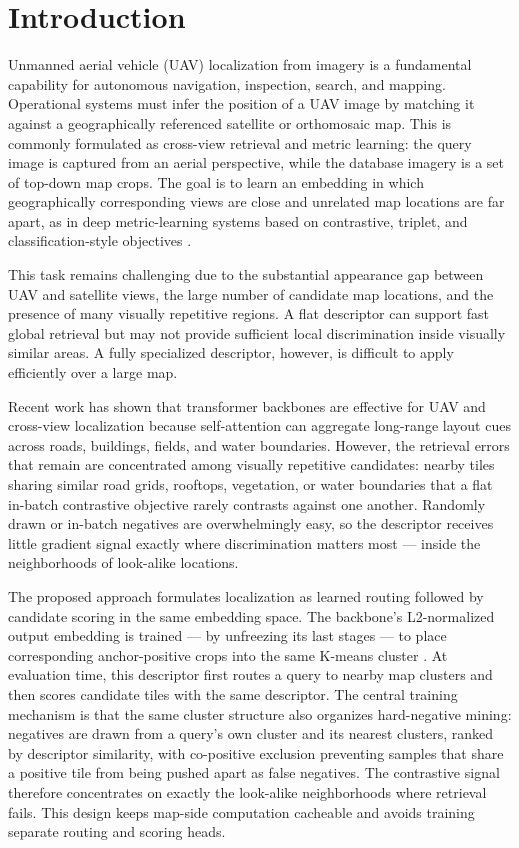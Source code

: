 \documentclass[conference]{IEEEtran}
\begin{document}
\section{Introduction}
Unmanned aerial vehicle (UAV) localization from imagery is a fundamental
capability for autonomous navigation, inspection, search, and mapping.
Operational systems must infer the position of a UAV image by matching it
against a geographically referenced satellite or orthomosaic map. This is
commonly formulated as cross-view retrieval and metric learning: the query image is
captured from an aerial perspective, while the database imagery is a set of
top-down map crops. The goal is to learn an embedding in which geographically
corresponding views are close and unrelated map locations are far apart, as in
deep metric-learning systems based on contrastive, triplet, and
classification-style objectives \cite{hadsell2006dimensionality,schroff2015facenet,sohn2016improved}.

This task remains challenging due to the substantial appearance gap between
UAV and satellite views, the large number of candidate map locations, and the
presence of many visually repetitive regions. A flat descriptor can support fast
global retrieval but may not provide sufficient local discrimination inside
visually similar areas. A fully specialized descriptor, however, is difficult
to apply efficiently over a large map.

Recent work has shown that transformer backbones are effective for UAV and
cross-view localization because self-attention can aggregate long-range layout
cues across roads, buildings, fields, and water boundaries. However, the
retrieval errors that remain are concentrated among visually repetitive
candidates: nearby tiles sharing similar road grids, rooftops, vegetation, or
water boundaries that a flat in-batch contrastive objective rarely contrasts
against one another. Randomly drawn or in-batch negatives are overwhelmingly
easy, so the descriptor receives little gradient signal exactly where
discrimination matters most — inside the neighborhoods of look-alike
locations.

The proposed approach formulates localization as learned routing followed by
candidate scoring in the same embedding space. The backbone's L2-normalized
output embedding is trained — by unfreezing its last stages — to place
corresponding anchor-positive crops into the
same K-means cluster \cite{macqueen1967methods}. At evaluation time, this
descriptor first routes a query to nearby map clusters and then scores
candidate tiles with the same descriptor. The central training mechanism is
that the same cluster structure also organizes hard-negative mining: negatives
are drawn from a query's own cluster and its nearest clusters, ranked by
descriptor similarity, with co-positive exclusion preventing samples that
share a positive tile from being pushed apart as false negatives. The
contrastive signal therefore concentrates on exactly the look-alike
neighborhoods where retrieval fails. This design keeps map-side computation
cacheable and avoids training separate routing and scoring heads.
\end{document}
